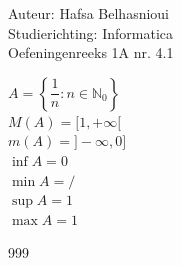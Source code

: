 \documentclass[a4paper]{article}
\begin{document}
\noindent \large Auteur: Hafsa Belhasnioui \\
\noindent \large Studierichting: Informatica\\
\noindent \large Oefeningenreeks 1A nr. 4.1\\

\medskip

\normalsize

$A = \left\{\dfrac{1}{n} : n \in \mathbb{N}_0 \right\}$\\

$M(A) = [1, + \infty[$\\

$m(A) = ]-\infty, 0]$\\

$\inf A = 0$\\

$\min A = /$\\

$\sup A = 1$\\

$\max A = 1$\\


\begin{thebibliography}{999}
\end{thebibliography}
\end{document}
